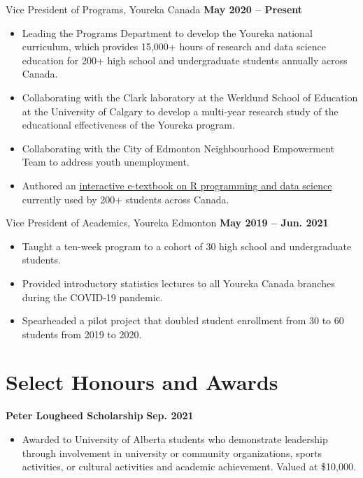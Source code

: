 \documentclass{article}
\begin{document}
Vice President of Programs, Youreka Canada \hfill \textbf{May 2020 -- Present}
\begin{itemize}
    \item Leading the Programs Department to develop the Youreka national curriculum, which provides 15,000+ hours of research and data science education for 200+ high school and undergraduate students annually across Canada.
    \item Collaborating with the Clark laboratory at the Werklund School of Education at the University of Calgary to develop a multi-year research study of the educational effectiveness of the Youreka program.
    \item Collaborating with the City of Edmonton Neighbourhood Empowerment Team to address youth unemployment.
    \item Authored an \href{https://youreka-textbook.netlify.app/}{interactive e-textbook on R programming and data science} currently used by 200+ students across Canada.
\end{itemize}

Vice President of Academics, Youreka Edmonton \hfill \textbf{May 2019 -- Jun. 2021}
\begin{itemize}
    \item Taught a ten-week program to a cohort of 30 high school and undergraduate students.
    \item Provided introductory statistics lectures to all Youreka Canada branches during the COVID-19 pandemic.
    \item Spearheaded a pilot project that doubled student enrollment from 30 to 60 students from 2019 to 2020.
\end{itemize}


\section*{\textcolor{my_colour}{Select Honours and Awards}}
\vspace{-.25em} \hrulefill \vspace{.75em}

\textbf{Peter Lougheed Scholarship} \hfill \textbf{Sep. 2021}
\begin{itemize}
    \item Awarded to University of Alberta students who demonstrate leadership through involvement in university or community organizations, sports activities, or cultural activities and academic achievement. Valued at \$10,000.
\end{itemize}
\end{document}
